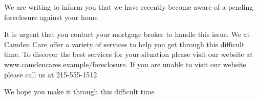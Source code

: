 \documentclass[10pt,stdletter]{newlfm}
\begin{document}
    \begin{newlfm}

    We are writing to inform you that we have recently become aware of a pending foreclosure against your home

    It is urgent that you contact your mortgage broker to handle this issue.
    We at Camden Care offer a variety of services to help you get through this difficult time. To discover the best services for your situation please visit our website at www.camdencares.example/foreclosure.
    If you are unable to visit our website please call us at 215-555-1512

    We hope you make it through this difficult time

    \end{newlfm}
    \pagebreak
{}
\end{document}
